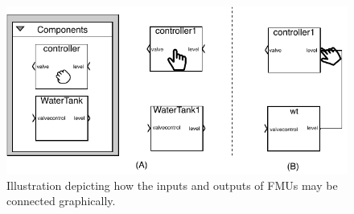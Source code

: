 \begin{figure}[bt]
\centering
\includegraphics[width=0.8\columnwidth]{Images/connecting_fmus.pdf}
\caption{Illustration depicting how the inputs and outputs of FMUs may be connected graphically.}
\label{fig:connecting_fmus}
\end{figure}
